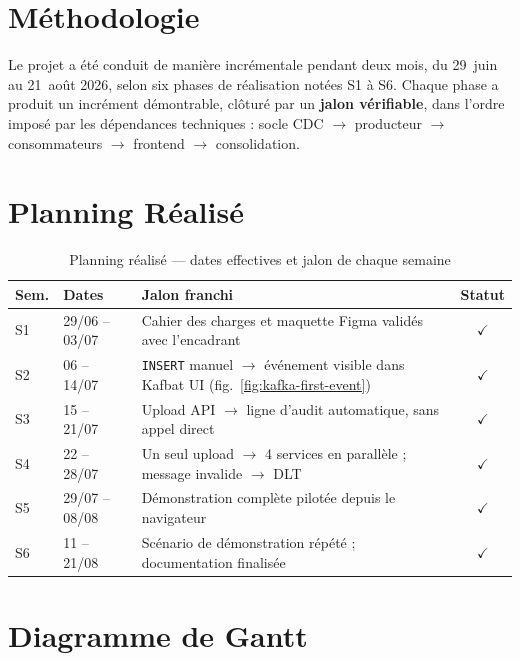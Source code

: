 \documentclass[12pt,a4paper,openany]{report}
\begin{document}
    \section{M\'ethodologie}

    Le projet a \'et\'e conduit de mani\`ere incr\'ementale pendant deux mois, du 29~juin au 21~ao\^ut 2026, selon six phases de r\'ealisation not\'ees S1 \`a S6. Chaque phase a produit un incr\'ement d\'emontrable, cl\^otur\'e par un \textbf{jalon v\'erifiable}, dans l'ordre impos\'e par les d\'ependances techniques : socle CDC $\to$ producteur $\to$ consommateurs $\to$ frontend $\to$ consolidation.

    \section{Planning R\'ealis\'e}

    \begin{table}[H]
    \centering
    \small
    \renewcommand{\arraystretch}{1.3}
    \begin{tabularx}{\textwidth}{@{}P{1.1cm}P{2.2cm}Xc@{}}
    \toprule
    \textbf{Sem.} & \textbf{Dates} & \textbf{Jalon franchi} & \textbf{Statut} \\
    \midrule
    S1 & 29/06 -- 03/07 & Cahier des charges et maquette Figma valid\'es avec l'encadrant & $\checkmark$ \\
    S2 & 06 -- 14/07 & \texttt{INSERT} manuel $\to$ \'ev\'enement visible dans Kafbat UI (fig.~\ref{fig:kafka-first-event}) & $\checkmark$ \\
    S3 & 15 -- 21/07 & Upload API $\to$ ligne d'audit automatique, sans appel direct & $\checkmark$ \\
    S4 & 22 -- 28/07 & Un seul upload $\to$ 4 services en parall\`ele ; message invalide $\to$ DLT & $\checkmark$ \\
    S5 & 29/07 -- 08/08 & D\'emonstration compl\`ete pilot\'ee depuis le navigateur & $\checkmark$ \\
    S6 & 11 -- 21/08 & Sc\'enario de d\'emonstration r\'ep\'et\'e ; documentation finalis\'ee & $\checkmark$ \\
    \bottomrule
    \end{tabularx}
    \caption{Planning r\'ealis\'e --- dates effectives et jalon de chaque semaine}
    \end{table}

    \section{Diagramme de Gantt}
\end{document}
